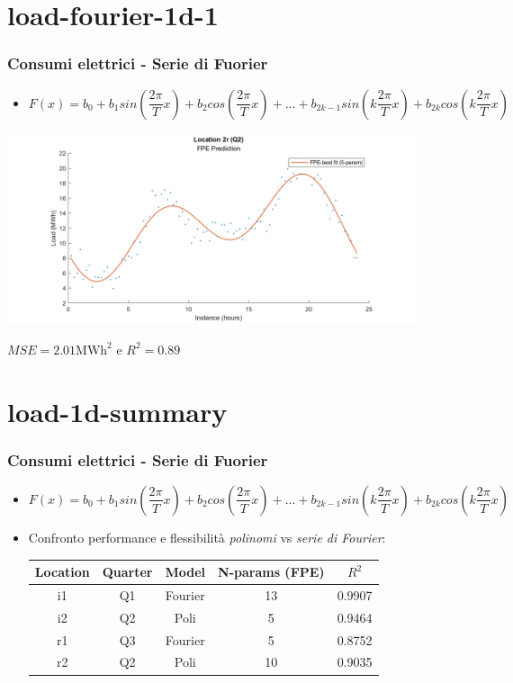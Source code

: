 \documentclass{beamer}
\begin{document}
\section{load-fourier-1d-1}
\begin{frame}
    \frametitle{Consumi elettrici - Serie di Fuorier}  
    \begin{itemize}
        \item $F(x)=b_0+
	b_1sin\left(\dfrac{2\pi}{T}x\right)+b_2cos\left(\dfrac{2\pi}{T}x\right)+...+
	b_{2k-1}sin\left(k\dfrac{2\pi}{T}x\right)+b_{2k}cos\left(k\dfrac{2\pi}{T}x\right)$    
 
    \end{itemize}
    \vfill
    \centering
    \includegraphics[width=0.9\textwidth,keepaspectratio]{2_r_q2_FPE_fourier.png} 
    
    \scriptsize $MSE=2.01\text{MWh}^2$ e $R^2=0.89$
\end{frame}

\section{load-1d-summary}
\begin{frame}
    \frametitle{Consumi elettrici - Serie di Fuorier}   
    \begin{itemize}
        \item $F(x)=b_0+
	b_1sin\left(\dfrac{2\pi}{T}x\right)+b_2cos\left(\dfrac{2\pi}{T}x\right)+...+
	b_{2k-1}sin\left(k\dfrac{2\pi}{T}x\right)+b_{2k}cos\left(k\dfrac{2\pi}{T}x\right)$  
        \vspace{0.7cm}
        \item Confronto performance e flessibilità \textit{polinomi} vs \textit{serie di Fourier}:\\
        \vspace{0.3cm}
        \begin{tabular}{|c|c|c|c|c|}
            \hline
            \textbf{Location} & \textbf{Quarter} & \textbf{Model} & \textbf{N-params (FPE)} & \textbf{$R^2$} \\
            \hline
             i1 &    Q1 &    Fourier &     13 &     0.9907 \\
             i2 &     Q2 &    Poli &      5 &     0.9464 \\
             r1 &    Q3 &     Fourier &      5 &     0.8752 \\
             r2 &     Q2 &     Poli &      10 &     0.9035 \\
            \hline
        \end{tabular}
    \end{itemize}
    \vfill
\end{frame}
\end{document}
